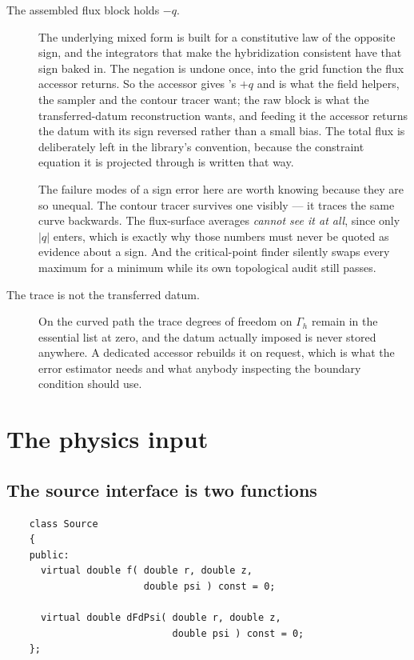 \begin{description}

\item[The assembled flux block holds $-q$.] The underlying mixed form is built
	for a constitutive law of the opposite sign, and the integrators that make
	the hybridization consistent have that sign baked in. The negation is undone
	once, into the grid function the flux accessor returns. So the accessor gives
	{\meq}'s $+q$ and is what the field helpers, the sampler and the contour
	tracer want; the raw block is what the transferred-datum reconstruction
	wants, and feeding it the accessor returns the datum with its sign reversed
	rather than a small bias. The total flux is deliberately left in the
	library's convention, because the constraint equation it is projected
	through is written that way.

	The failure modes of a sign error here are worth knowing because they are so
	unequal. The contour tracer survives one visibly --- it traces the same curve
	backwards. The flux-surface averages \emph{cannot see it at all}, since only
	$|q|$ enters, which is exactly why those numbers must never be quoted as
	evidence about a sign. And the critical-point finder silently swaps every
	maximum for a minimum while its own topological audit still passes.

\item[The trace is not the transferred datum.] On the curved
	path the trace degrees of freedom on $\Gamma_h$ remain in the essential list
	at zero, and the datum actually imposed is never stored anywhere. A
	dedicated accessor rebuilds it on request, which is what the error estimator
	needs and what anybody inspecting the boundary condition should use.

\end{description}

\section{The physics input}

\subsection{The source interface is two functions}

\begin{verbatim}
    class Source
    {
    public:
      virtual double f( double r, double z,
                        double psi ) const = 0;

      virtual double dFdPsi( double r, double z,
                             double psi ) const = 0;
    };
\end{verbatim}

